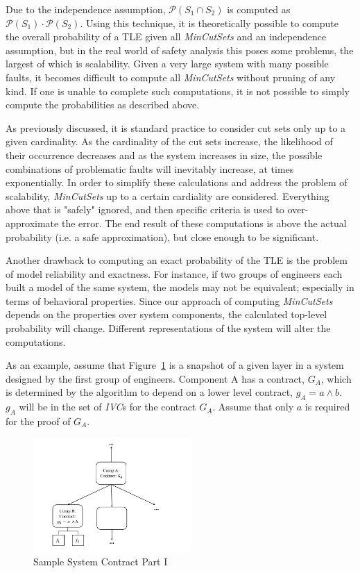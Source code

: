 Due to the independence assumption, $\mathcal{P}(S_1 \cap S_2)$ is computed as $\mathcal{P}(S_1) \cdot   \mathcal{P}(S_2)$. Using this technique, it is theoretically possible to compute the overall probability of a TLE given all \textit{MinCutSets} and an independence assumption, but in the real world of safety analysis this poses some problems, the largest of which is scalability. Given a very large system with many possible faults, it becomes difficult to compute all \textit{MinCutSets} without pruning of any kind. If one is unable to complete such computations, it is not possible to simply compute the probabilities as described above. 

As previously discussed, it is standard practice to consider cut sets only up to a given cardinality. As the cardinality of the cut sets increase, the likelihood of their occurrence decreases and as the system increases in size, the possible combinations of problematic faults will inevitably increase, at times exponentially. In order to simplify these calculations and address the problem of scalability, \textit{MinCutSets} up to a certain cardiality are considered. Everything above that is "safely" ignored, and then specific criteria is used to over-approximate the error. The end result of these computations is above the actual probability (i.e. a safe approximation), but close enough to be significant. 

Another drawback to computing an exact probability of the TLE is the problem of model reliability and exactness. For instance, if two groups of engineers each built a model of the same system, the models may not be equivalent; especially in terms of behavioral properties. Since our approach of computing \textit{MinCutSets} depends on the properties over system components, the calculated top-level probability will change. Different representations of the system will alter the computations.  

As an example, assume that Figure~\ref{fig:probComp1} is a snapshot of a given layer in a system designed by the first group of engineers. Component A has a contract, $G_A$, which is determined by the \aivcalg algorithm to depend on a lower level contract, $g_A = a \land b$. $g_A$ will be in the set of \textit{IVC}s for the contract $G_A$. Assume that only $a$ is required for the proof of $G_A$. 

\begin{figure}[h]
\begin{center}
\includegraphics[width=6cm]{images/probComp1.PNG}
\caption{Sample System Contract Part I} \label{fig:probComp1}
\end{center}
\end{figure}

